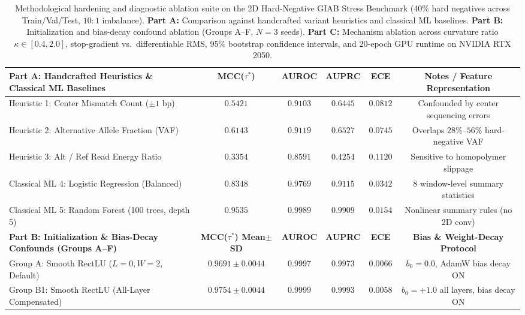 \documentclass[10pt,a4paper]{article}
\begin{document}
\begin{enumerate}
\end{enumerate}

\begin{table}[t]
\centering
\caption{Methodological hardening and diagnostic ablation suite on the 2D Hard-Negative GIAB Stress Benchmark (40\% hard negatives across Train/Val/Test, $10:1$ imbalance). \textbf{Part A:} Comparison against handcrafted variant heuristics and classical ML baselines. \textbf{Part B:} Initialization and bias-decay confound ablation (Groups A--F, $N=3$ seeds). \textbf{Part C:} Mechanism ablation across curvature ratio $\kappa \in [0.4, 2.0]$, stop-gradient vs.\ differentiable RMS, 95\% bootstrap confidence intervals, and 20-epoch GPU runtime on NVIDIA RTX 2050.}
\label{tab:rebuttal_suite}
\footnotesize
\setlength{\tabcolsep}{4.6pt}
\renewcommand{\arraystretch}{1.05}
\begin{tabular}{lccccc}
\toprule
\textbf{Part A: Handcrafted Heuristics \& Classical ML Baselines} & \textbf{MCC($\tau^*$)} & \textbf{AUROC} & \textbf{AUPRC} & \textbf{ECE} & \textbf{Notes / Feature Representation} \\
\midrule
Heuristic 1: Center Mismatch Count ($\pm 1\text{ bp}$) & $0.5421$ & $0.9103$ & $0.6445$ & $0.0812$ & Confounded by center sequencing errors \\
Heuristic 2: Alternative Allele Fraction (VAF) & $0.6143$ & $0.9119$ & $0.6527$ & $0.0745$ & Overlaps $28\%$--$56\%$ hard-negative VAF \\
Heuristic 3: Alt / Ref Read Energy Ratio & $0.3354$ & $0.8591$ & $0.4254$ & $0.1120$ & Sensitive to homopolymer slippage \\
Classical ML 4: Logistic Regression (Balanced) & $0.8348$ & $0.9769$ & $0.9115$ & $0.0342$ & 8 window-level summary statistics \\
Classical ML 5: Random Forest (100 trees, depth 5) & $0.9535$ & $0.9989$ & $0.9909$ & $0.0154$ & Nonlinear summary rules (no 2D conv) \\
\midrule
\textbf{Part B: Initialization \& Bias-Decay Confounds (Groups A--F)} & \textbf{MCC($\tau^*$) Mean$\pm$SD} & \textbf{AUROC} & \textbf{AUPRC} & \textbf{ECE} & \textbf{Bias \& Weight-Decay Protocol} \\
\midrule
Group A: Smooth RectLU ($L=0, W=2$, Default) & $0.9691 \pm 0.0044$ & $0.9997$ & $0.9973$ & $0.0066$ & $b_0 = 0.0$, AdamW bias decay ON \\
Group B1: Smooth RectLU (All-Layer Compensated) & $0.9754 \pm 0.0044$ & $0.9999$ & $0.9993$ & $0.0058$ & $b_0 = +1.0$ all layers, bias decay ON \\

\end{tabular}
\end{table}
\end{document}
